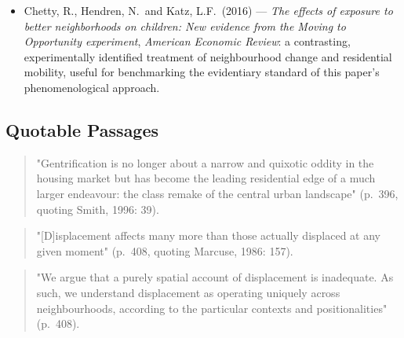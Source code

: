\begin{itemize}
\begin{itemize}
      \item Chetty, R., Hendren, N.\ and Katz, L.F.\ (2016) --- \textit{The effects of exposure to better neighborhoods on children: New evidence from the Moving to Opportunity experiment}, \textit{American Economic Review}: a contrasting, experimentally identified treatment of neighbourhood change and residential mobility, useful for benchmarking the evidentiary standard of this paper's phenomenological approach.
    \end{itemize}
\end{itemize}

\subsection*{Quotable Passages}

\begin{quote}
"Gentrification is no longer about a narrow and quixotic oddity in the housing market but has become the leading residential edge of a much larger endeavour: the class remake of the central urban landscape" (p.~396, quoting Smith, 1996: 39).
\end{quote}

\begin{quote}
"[D]isplacement affects many more than those actually displaced at any given moment" (p.~408, quoting Marcuse, 1986: 157).
\end{quote}

\begin{quote}
"We argue that a purely spatial account of displacement is inadequate. As such, we understand displacement as operating uniquely across neighbourhoods, according to the particular contexts and positionalities" (p.~408).
\end{quote}
